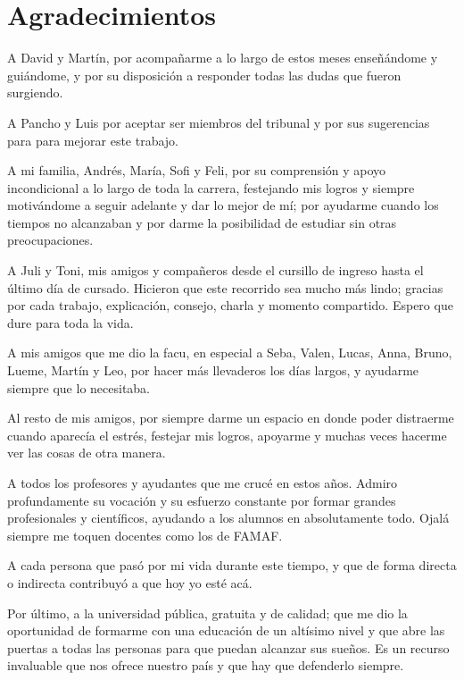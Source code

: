 \documentclass[a4paper,12pt,spanish]{book}
\begin{document}

\thispagestyle{empty} %
\clearpage

\thispagestyle{empty}
\null
\clearpage


\clearpage

\chapter*{Agradecimientos}
A David y Martín, por acompañarme a lo largo de estos meses enseñándome y guiándome,
y por su disposición a responder todas las dudas que fueron surgiendo.

A Pancho y Luis por aceptar ser miembros del tribunal y por sus sugerencias para
para mejorar este trabajo.

A mi familia, Andrés, María, Sofi y Feli, por su comprensión y apoyo incondicional a lo
largo de toda la carrera, festejando mis logros y siempre motivándome a seguir adelante y
dar lo mejor de mí; por ayudarme cuando los tiempos no alcanzaban y por darme la
posibilidad de estudiar sin otras preocupaciones.

A Juli y Toni, mis amigos y compañeros desde el cursillo de ingreso hasta el último día de
cursado. Hicieron que este recorrido sea mucho más lindo; gracias por cada trabajo,
explicación, consejo, charla y momento compartido. Espero que dure para toda la vida.

A mis amigos que me dio la facu, en especial a Seba, Valen, Lucas, Anna, Bruno,
Lueme, Martín y Leo, por hacer más llevaderos los días largos, y ayudarme siempre que
lo necesitaba.

Al resto de mis amigos, por siempre darme un espacio en donde poder distraerme cuando
aparecía el estrés, festejar mis logros, apoyarme y muchas veces hacerme ver las cosas de
otra manera.

A todos los profesores y ayudantes que me crucé en estos años. Admiro profundamente su
vocación y su esfuerzo constante por formar grandes profesionales y científicos, ayudando
a los alumnos en absolutamente todo. Ojalá siempre me toquen docentes como los de FAMAF.

A cada persona que pasó por mi vida durante este tiempo, y que de forma directa
o indirecta contribuyó a que hoy yo esté acá.

Por último, a la universidad pública, gratuita y de calidad; que me dio la oportunidad de
formarme con una educación de un altísimo nivel y que abre las puertas a todas las
personas para que puedan alcanzar sus sueños. Es un recurso invaluable que nos ofrece
nuestro país y que hay que defenderlo siempre.
\clearpage
\end{document}
